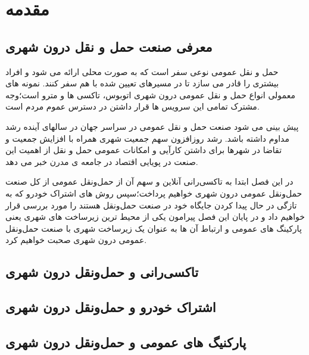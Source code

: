 \chapter{مقدمه}

\section{معرفی صنعت حمل و نقل درون شهری}
حمل و نقل عمومی نوعی سفر است که به صورت محلی ارائه می شود و افراد بیشتری را قادر می سازد تا در مسیرهای تعیین شده با هم سفر کنند. نمونه های معمولی انواع حمل و نقل عمومی درون شهری اتوبوس، تاکسی ها و مترو است؛‌وجه مشترک تمامی این سرویس ها قرار داشتن در دسترس عموم مردم است.

پیش بینی می شود صنعت حمل و نقل عمومی در سراسر جهان در سالهای آینده رشد مداوم داشته باشد. رشد روزافزون سهم جمعیت شهری همراه با افزایش جمعیت و تقاضا در شهرها برای داشتن کارآیی و امکانات عمومی حمل و نقل از اهمیت این صنعت در پویایی اقتصاد در جامعه ی مدرن خبر می دهد.

در این فصل ابتدا به تاکسی‌رانی آنلاین و سهم آن از حمل‌و‌نقل عمومی از کل صنعت حمل‌و‌نقل عمومی درون شهری خواهیم پرداخت؛سپس روش های اشتراک خودرو که به تازگی در حال پیدا کردن جایگاه خود در صنعت حمل‌و‌نقل هستند را مورد بررسی قرار خواهیم داد و در پایان این فصل پیرامون یکی از محیط ترین زیرساخت های شهری یعنی پارکینگ های عمومی و ارتباط آن ها به عنوان یک زیرساخت شهری با صنعت حمل‌و‌نقل عمومی درون شهری صحبت خواهیم کرد.

\section{تاکسی‌رانی و حمل‌و‌نقل درون شهری}

\section{اشتراک خودرو و حمل‌و‌نقل درون شهری}

\section{پارکنیگ های عمومی و حمل‌و‌نقل درون شهری}